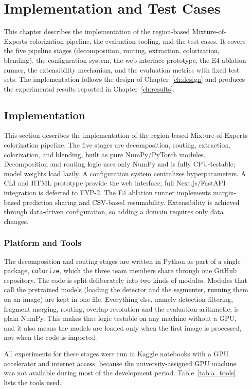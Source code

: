 \documentclass{FastFyp}
\begin{document}
\chapter{Implementation and Test Cases}
This chapter describes the implementation of the region-based Mixture-of-Experts colorization pipeline, the evaluation tooling, and the test cases. It covers the five pipeline stages (decomposition, routing, extraction, colorization, blending), the configuration system, the web interface prototype, the E4 ablation runner, the extensibility mechanism, and the evaluation metrics with fixed test sets. The implementation follows the design of Chapter~\ref{ch:design} and produces the experimental results reported in Chapter~\ref{ch:results}.

\section{Implementation}
This section describes the implementation of the region-based Mixture-of-Experts colorization pipeline. The five stages are decomposition, routing, extraction, colorization, and blending, built as pure NumPy/PyTorch modules. Decomposition and routing logic uses only NumPy and is fully CPU-testable; model weights load lazily. A configuration system centralizes hyperparameters. A CLI and HTML prototype provide the web interface; full Next.js/FastAPI integration is deferred to FYP-2. The E4 ablation runner implements margin-based prediction sharing and CSV-based resumability. Extensibility is achieved through data-driven configuration, so adding a domain requires only data changes.
\subsection{Platform and Tools}
The decomposition and routing stages are written in Python as part of a single package, \texttt{colorize}, which the three team members share through one GitHub repository. The code is split deliberately into two kinds of modules. Modules that call the pretrained models (loading the detector and the segmenter, running them on an image) are kept in one file. Everything else, namely detection filtering, fragment merging, routing, overlap resolution and the evaluation arithmetic, is plain NumPy. This makes that logic testable on any machine without a GPU, and it also means the models are loaded only when the first image is processed, not when the code is imported.
 
All experiments for these stages were run in Kaggle notebooks with a GPU accelerator and internet access, because the university-assigned GPU machine was not available during most of the development period. Table~\ref{tab:a_tools} lists the tools used.
\end{document}
